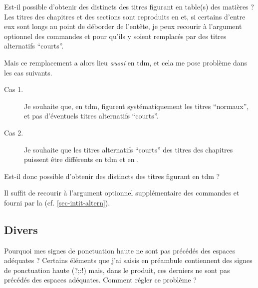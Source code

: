 \begin{dbfaq}{Est-il possible d'obtenir des  distincts
    des titres figurant en table(s) des matières ?}{}
  Les titres des chapitres et des sections sont reproduits en
   et, si certains d'entre eux sont longs au point de
  déborder de l'entête, je peux recourir à l'argument optionnel des commandes
   et  pour qu'ils y soient
  remplacés par des titres alternatifs \enquote{courts}.

  Mais ce remplacement a alors lieu \emph{aussi} en \gls{tdm}, et cela me pose
  problème dans les cas suivants.
  \begin{description}
  \item[Cas 1.] Je souhaite que, en \gls{tdm}, figurent systématiquement les
    titres \enquote{normaux}, et pas d'éventuels titres alternatifs
    \enquote{courts}.
  \item[Cas 2.] Je souhaite que les titres alternatifs \enquote{courts} des
    titres des chapitres puissent être différents en \gls{tdm} et en
    .
  \end{description}
  Est-il donc possible d'obtenir des  distincts des
  titres figurant en \gls{tdm} ?%
\end{dbfaq}

Il suffit de recourir à l'argument optionnel supplémentaire des commandes
 et  fourni par la \yatCl{}
(cf. \vref{sec-intit-altern}).

\subsection{Divers}
\label{sec-divers}

\begin{dbfaq}{Pourquoi mes signes de ponctuation haute ne sont pas précédés des
    espaces adéquates ?}{}
  Certains éléments que j'ai saisis en préambule contiennent des signes de
  ponctuation haute ({\NoAutoSpacing?;:!}) mais, dans le \pdf{} produit, ces
  derniers ne sont pas précédés des espaces adéquates. Comment régler ce
  problème ?
\end{dbfaq}

